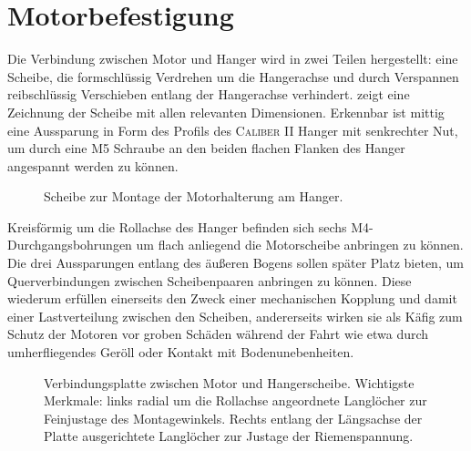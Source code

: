 	\section{Motorbefestigung}\label{sec:motorbefestigung}
		Die Verbindung zwischen Motor und Hanger wird in zwei Teilen hergestellt: eine Scheibe, die formschlüssig Verdrehen um die Hangerachse und durch Verspannen reibschlüssig Verschieben entlang der Hangerachse verhindert.
		 zeigt eine Zeichnung der Scheibe mit allen relevanten Dimensionen.
		Erkennbar ist mittig eine Aussparung in Form des Profils des \textsc{Caliber II} Hanger mit senkrechter Nut, um durch eine M5 Schraube an den beiden flachen Flanken des Hanger angespannt werden zu können.
		\begin{figure}[h]
			\centering
			
			\caption[Scheibe zur Montage der Motorhalterung am Hanger]{Scheibe zur Montage der Motorhalterung am Hanger.}
			\label{fig:hanger clamp drawing}
		\end{figure}
		Kreisförmig um die Rollachse des Hanger befinden sich sechs M4-Durchgangsbohrungen um flach anliegend die Motorscheibe anbringen zu können.
		Die drei Aussparungen entlang des äußeren Bogens sollen später Platz bieten, um Querverbindungen zwischen Scheibenpaaren anbringen zu können.
		Diese wiederum erfüllen einerseits den Zweck einer mechanischen Kopplung und damit einer Lastverteilung zwischen den Scheiben, andererseits wirken sie als Käfig zum Schutz der Motoren vor groben Schäden während der Fahrt wie etwa durch umherfliegendes Geröll oder Kontakt mit Bodenunebenheiten.
		\begin{figure}[h]
			\centering
			
			\caption[Verbindungsplatte zwischen Motor und Hangerscheibe]{Verbindungsplatte zwischen Motor und Hangerscheibe. Wichtigste Merkmale: links radial um die Rollachse angeordnete Langlöcher zur Feinjustage des Montagewinkels. Rechts entlang der Längsachse der Platte ausgerichtete Langlöcher zur Justage der Riemenspannung.}
			\label{fig:motor piece drawing}
		\end{figure}

